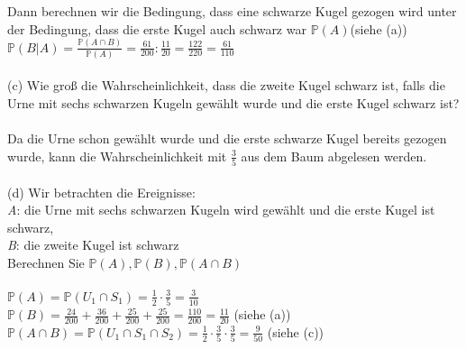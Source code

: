 \documentclass[a4paper]{article}
\begin{document}
Dann berechnen wir die Bedingung, dass eine schwarze Kugel gezogen wird unter der Bedingung, dass die erste Kugel auch schwarz war $\mathbb{P}(A)$(siehe (a))\\
\(\mathbb{P}(B \vert A) = \frac{\mathbb{P}(A \cap B)}{\mathbb{P}(A)}= \frac{61}{200} : \frac{11}{20}=\frac{122}{220}= \frac{61}{110}\)\\\\
\clearpage
\noindent (c) Wie groß die Wahrscheinlichkeit, dass die zweite Kugel schwarz ist, falls die Urne mit sechs schwarzen Kugeln gewählt wurde und die erste Kugel schwarz ist?\\\\
Da die Urne schon gewählt wurde und die erste schwarze Kugel bereits gezogen wurde, kann die Wahrscheinlichkeit mit $\frac{3}{5}$ aus dem Baum abgelesen werden.\\\\
(d) Wir betrachten die Ereignisse:\\
\hspace*{0,5cm}\textit{A}: die Urne mit sechs schwarzen Kugeln wird gewählt und die erste Kugel ist schwarz,\\
\hspace*{0,5cm}\textit{B}: die zweite Kugel ist schwarz\\
\hspace*{0,5cm}Berechnen Sie $\mathbb{P}(A), \mathbb{P}(B), \mathbb{P}(A \cap B)$\\\\
\(\mathbb{P}(A)=\mathbb{P}(U_1 \cap S_1)=\frac{1}{2}\cdot \frac{3}{5}=\frac{3}{10}\)\\
\(\mathbb{P}(B)=\frac{24}{200}+\frac{36}{200}+\frac{25}{200}+\frac{25}{200}=\frac{110}{200}=\frac{11}{20}\) (siehe (a))\\
\(\mathbb{P}(A \cap B)=\mathbb{P}(U_1 \cap S_1 \cap S_2)= \frac{1}{2}\cdot\frac{3}{5}\cdot\frac{3}{5}=\frac{9}{50}\) (siehe (c))
\end{document}
